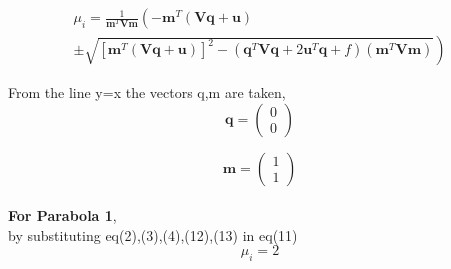 \documentclass[journal,12pt,twocolumn]{IEEEtran}
\newcommand{\myvec}[1]{\ensuremath{\begin{pmatrix}#1\end{pmatrix}}}
\let\vec\mathbf
\let\vec\mathbf
\providecommand{\brak}[1]{\ensuremath{\left(#1\right)}}
\providecommand{\lbrak}[1]{\ensuremath{\left(#1\right.}}
\providecommand{\rbrak}[1]{\ensuremath{\left.#1\right)}}
\providecommand{\sbrak}[1]{\ensuremath{{}\left[#1\right]}}
\begin{document}
{\tiny
\begin{multline}
\mu_i = \frac{1}
{
\vec{m}^T\vec{V}\vec{m}
}
\lbrak{-\vec{m}^T\brak{\vec{V}\vec{q}+\vec{u}}}
\\
\pm
\rbrak{\sqrt{
\sbrak{
\vec{m}^T\brak{\vec{V}\vec{q}+\vec{u}}
}^2
-
\brak
{
\vec{q}^T\vec{V}\vec{q} + 2\vec{u}^T\vec{q} +f
}
\brak{\vec{m}^T\vec{V}\vec{m}}
}
}
\end{multline}

From the line y=x the vectors q,m are taken,
\begin{equation}
\vec{q}=\myvec{0\\0}
\end{equation}

\begin{equation}
\vec{m}=\myvec{1\\1}
\end{equation}
\\
\textbf{For Parabola 1},\\

by substituting eq(2),(3),(4),(12),(13) in eq(11)
\begin{equation}
\mu_i=2
\end{equation}

}
\end{document}
